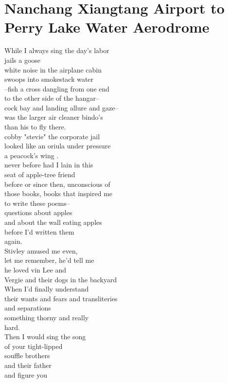 \documentclass[smalldemyvopaper,11pt,twoside,onecolumn,openright,extrafontsizes]{memoir}
\begin{document}
\chapter{Nanchang Xiangtang Airport to Perry Lake Water Aerodrome}
While I always sing the day's labor
\\jails a goose
\\white noise in the airplane cabin
\\swoops into smokestack water
\\--fish a cross dangling from one end
\\to the other side of the hangar--
\\cock bay and landing allure and gaze--
\\was the larger air cleaner bindo's
\\than his to fly there.
\\cobby "stevie" the corporate jail
\\looked like an oriula under pressure
\\a peacock's wing         .
\\never before had I lain in this
\\seat of apple-tree friend
\\before or since then, unconscious of
\\those books, books that inspired me
\\to write these poems--
\\questions about apples
\\and about the wall eating apples
\\before I'd written them
\\again.
\\Stivley amused me even,
\\let me remember, he'd tell me
\\he loved vin Lee and
\\Vergie and their dogs in the backyard
\\When I'd finally understand
\\their wants and fears and transliteries
\\and separations
\\something thorny and really
\\hard.
\\Then I would sing the song
\\of your tight-lipped
\\souffle brothers
\\and their father
\\and figure you
\end{document}
